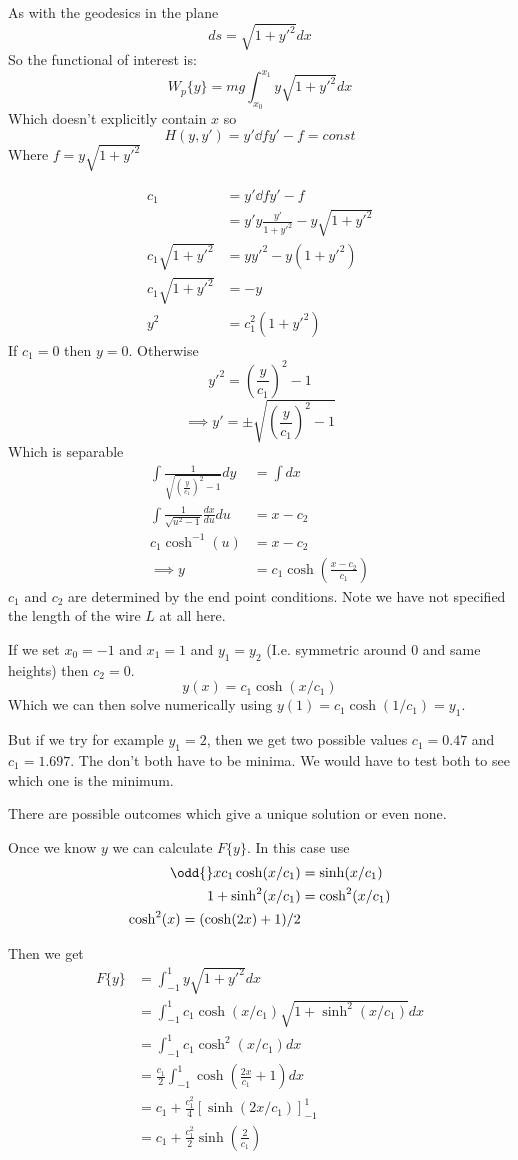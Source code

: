 \documentclass{E:/Documents/Latex/myassignment}
\begin{document}
As with the geodesics in the plane
\[ds = \sqrt{1+y'^2} dx\]
So the functional of interest is:
\[W_p\{y\} = mg \int_{x_0}^{x_1} y \sqrt{1+y'^2} dx\]
Which doesn't explicitly contain $x$ so 
\[H(y,y') = y'\dd f{y'} - f = const\]
Where $f = y\sqrt{1+y'^2}$

\begin{align*}
	c_1 &= y'\dd f{y'} - f \\
	&=y' y\frac{y'}{1+y'^2} - y\sqrt{1+y'^2}\\
	c_1 \sqrt{1+y'^2} &= yy'^2 - y(1+y'^2)\\
	c_1 \sqrt{1+y'^2} &= -y\\
	y^2 &= c_1^2 (1+y'^2)
\end{align*}
If $c_1 = 0$ then $y = 0$.
Otherwise
\[y'^2 = \left(\frac{y}{c_1} \right)^2- 1\]
\[\implies y' = \pm\sqrt{\left(\frac{y}{c_1} \right)^2- 1}\]
Which is separable
\begin{align*}
	\int \frac{1}{\sqrt{\left(\frac{y}{c_1} \right)^2- 1}} dy &= \int dx\\
	\int \frac{1}{\sqrt{u^2-1}} \frac{dx}{du} du&= x -c_2\\
	c_1 \cosh^{-1}(u) &= x - c_2\\
	\implies y &= c_1 \cosh\left(\frac{x - c_2}{c_1}\right)
\end{align*}
$c_1$ and $c_2$ are determined by the end point conditions. Note we have not specified the length of the wire $L$ at all here.

If we set $x_0 = -1$ and $x_1 = 1$ and $y_1=y_2$ (I.e. symmetric around $0$ and same heights) then $c_2 = 0$.
\[y(x) = c_1 \cosh (x/c_1)\]
Which we can then solve numerically using $y(1) = c_1 \cosh(1/c_1) = y_1$.

But if we try for example $y_1 = 2$, then we get two possible values $c_1 = 0.47$ and $c_1 = 1.697$. The don't both have to be minima.
We would have to test both to see which one is the minimum.

There are possible outcomes which give a unique solution or even none.


Once we know $y$ we can calculate $F\{y\}$. In this case use
\begin{align*}
	\odd{}x c_1\cosh(x/c_1) &= \sinh(x/c_1)\\
	1 + \sinh^2(x/c_1) &= \cosh^2(x/c_1)\\
	\cosh^2(x) = (\cosh(2x)+1)/2
\end{align*}

Then we get
\begin{align*}
	F\{y\} &= \int_{-1}^1 y\sqrt{1+y'^2} dx\\
	&= \int_{-1}^1 c_1\cosh(x/c_1) \sqrt{1+\sinh^2(x/c_1)} dx\\
	&= \int_{-1}^1 c_1\cosh^2(x/c_1)dx\\
	&= \frac{c_1}{2} \int_{-1}^1 \cosh(\frac{2x}{c_1} + 1) dx\\
	&= c_1 + \frac{c_1^2}{4}[\sinh(2x/c_1)]_{-1}^1\\
	&= c_1 + \frac{c_1^2}{2}\sinh(\frac{2}{c_1})
\end{align*}
\end{document}
